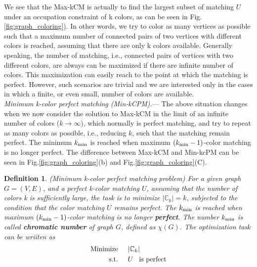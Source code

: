 \documentclass[%
 reprint,
nofootinbib,
 amsmath,amssymb,
 aps,
pra,
floatfix,
]{revtex4-2}
\newtheorem{definition}{Definition}
\begin{document}
We see that the Max-kCM is actually to find the largest subset of matching $U$ under an occupation constraint of k colors, as can be seen in Fig.\ref{fig:graph_coloring}). In other words, we try to color as many vertices as possible such that a maximum number of connected pairs of two vertices with different colors is reached, assuming that there are only k colors available. Generally speaking, the number of matching, i.e., connected pairs of vertices with two different colors, are always can be maximized if there are infinite number of colors. This maximization can easily reach to the point at which the matching is perfect. However, such scenarios are trivial and we are interested only in the cases in which a finite, or even small, number of colors are available.\\

\emph{Minimum k-color perfect matching {\rm (Min-kCPM)}.}---  The above situation changes when we now consider the solution to Max-kCM in the limit of an infinite number of colors ($k \to \infty$), which normally is perfect matching, and try to repeat as many colors as possible, i.e., reducing $k$,  such that the matching remain perfect. The minimum $k_{\rm min}$ is reached when maximum $(k_{\rm min}-1)$-color matching is no longer perfect. The difference between Max-kCM and Min-kcPM can be seen in Fig.\ref{fig:graph_coloring}(b) and Fig.\ref{fig:graph_coloring}(C).
\begin{definition}
\label{def:minimum-k-color-perfect-matching-problem}
{\rm (Minimum k-color perfect matching problem)} For a given graph $G=(V,E)$, and a perfect k-color matching $U$, assuming that the number of colors k is sufficiently large, the task is to minimize $|\mathbb{C}_k| = k$, subjected to the condition that the color matching $U$ remains perfect. The $k_{\rm min}$ is reached when maximum $(k_{\rm min}-1)$-color matching is no longer {\rm \textbf{perfect}}. The number $k_{\rm min}$ is called {\rm \textbf{chromatic number}} of graph $G$, defined as $\chi(G)$. The optimization task can be wriiten as 
\begin{align}\label{eq-min-kcpm}
\text{\rm Minimize} \hspace{5mm} &|\mathbb{C}_k|  \nonumber \\
\text{\rm s.t.} \hspace{5mm} &U \hspace{3mm} \text{\rm is perfect}
\end{align}
\end{definition}
\end{document}
